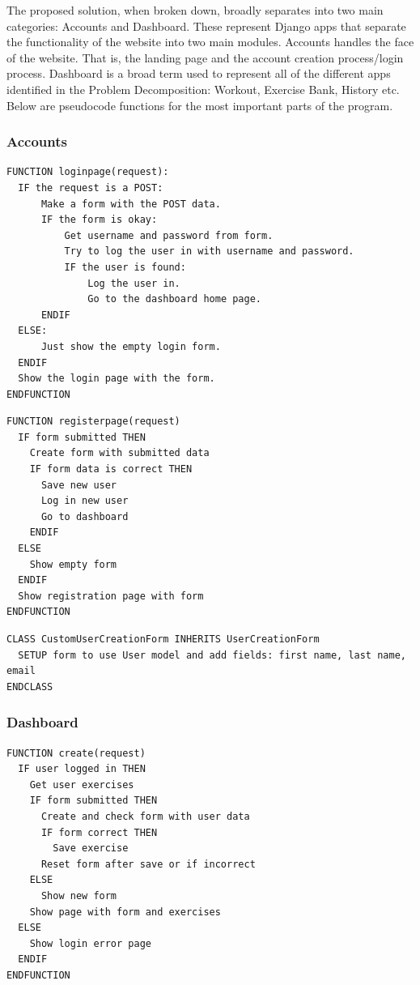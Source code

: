 \documentclass{article}
\begin{document}
The proposed solution, when broken down, broadly separates into two main categories: Accounts and Dashboard. These represent Django apps that separate the functionality of the website into two main modules. Accounts handles the face of the website. That is, the landing page and the account creation process/login process. Dashboard is a broad term used to represent all of the different apps identified in the Problem Decomposition: Workout, Exercise Bank, History etc. Below are pseudocode functions for the most important parts of the program. 

\subsubsection{Accounts}

\begin{lstlisting}[caption={Login Page}]
  FUNCTION loginpage(request):
  IF the request is a POST:
      Make a form with the POST data.
      IF the form is okay:
          Get username and password from form.
          Try to log the user in with username and password.
          IF the user is found:
              Log the user in.
              Go to the dashboard home page.
      ENDIF
  ELSE:
      Just show the empty login form.
  ENDIF
  Show the login page with the form.
ENDFUNCTION
\end{lstlisting}

\begin{lstlisting}[caption={Register Page}]
  FUNCTION registerpage(request)
  IF form submitted THEN
    Create form with submitted data
    IF form data is correct THEN
      Save new user
      Log in new user
      Go to dashboard
    ENDIF
  ELSE
    Show empty form
  ENDIF
  Show registration page with form
ENDFUNCTION

\end{lstlisting}

\begin{lstlisting}[caption={CustomUserCreationForm}]
  CLASS CustomUserCreationForm INHERITS UserCreationForm
  SETUP form to use User model and add fields: first name, last name, email
ENDCLASS
\end{lstlisting}

\subsubsection{Dashboard}

\begin{lstlisting}[caption={Exercise Creation view}]
  FUNCTION create(request)
  IF user logged in THEN
    Get user exercises
    IF form submitted THEN
      Create and check form with user data
      IF form correct THEN
        Save exercise
      Reset form after save or if incorrect
    ELSE
      Show new form
    Show page with form and exercises
  ELSE
    Show login error page
  ENDIF
ENDFUNCTION

\end{lstlisting}
\end{document}
